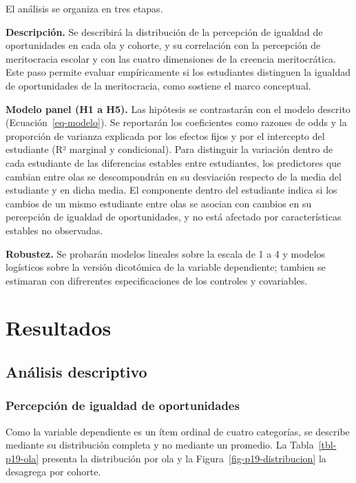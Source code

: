 \documentclass[
  spanish,
  a4paper,
  oneside]{scrbook}
\begin{document}
El análisis se organiza en tres etapas.

\textbf{Descripción.} Se describirá la distribución de la percepción de
igualdad de oportunidades en cada ola y cohorte, y su correlación con la
percepción de meritocracia escolar y con las cuatro dimensiones de la
creencia meritocrática. Este paso permite evaluar empíricamente si los
estudiantes distinguen la igualdad de oportunidades de la meritocracia,
como sostiene el marco conceptual.

\textbf{Modelo panel (H1 a H5).} Las hipótesis se contrastarán con el
modelo descrito (Ecuación~\ref{eq-modelo}). Se reportarán los
coeficientes como razones de odds y la proporción de varianza explicada
por los efectos fijos y por el intercepto del estudiante (R² marginal y
condicional). Para distinguir la variación dentro de cada estudiante de
las diferencias estables entre estudiantes, los predictores que cambian
entre olas se descompondrán en su desviación respecto de la media del
estudiante y en dicha media. El componente dentro del estudiante indica
si los cambios de un mismo estudiante entre olas se asocian con cambios
en su percepción de igualdad de oportunidades, y no está afectado por
características estables no observadas.

\textbf{Robustez.} Se probarán modelos lineales sobre la escala de 1 a 4
y modelos logísticos sobre la versión dicotómica de la variable
dependiente; tambien se estimaran con difrerentes especificaciones de
los controles y covariables.


\chapter{Resultados}\label{resultados}

\section{Análisis descriptivo}\label{anuxe1lisis-descriptivo}

\subsection{Percepción de igualdad de
oportunidades}\label{percepciuxf3n-de-igualdad-de-oportunidades}

Como la variable dependiente es un ítem ordinal de cuatro categorías, se
describe mediante su distribución completa y no mediante un promedio. La
Tabla~\ref{tbl-p19-ola} presenta la distribución por ola y la
Figura~\ref{fig-p19-distribucion} la desagrega por cohorte.
\end{document}
